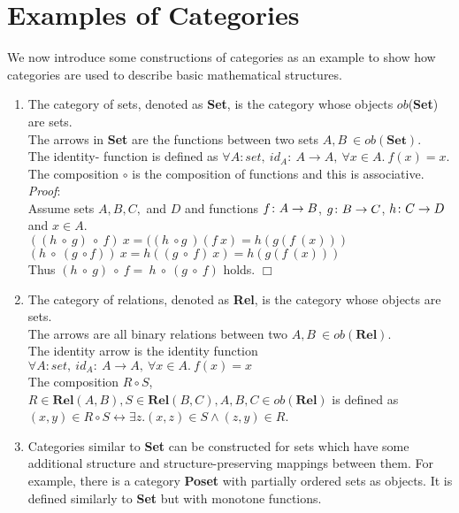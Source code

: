 \section {Examples of Categories}
We now introduce some constructions of categories as an example to show
how categories are used to describe basic mathematical structures.
\begin {enumerate}
 \item The category of sets, denoted as \textbf{Set}, is the category whose objects $ob$(\textbf{Set}) are sets.
   \\ The arrows in \textbf{Set} are the functions between two sets $A,B\ \in ob(\textbf{Set}).$
   \\ The identity- function is defined as $\forall A: set, \ id_A:\ A \to A,\ \forall x \in A. \ f (x) = x$.
   \\ The composition $\circ$ is the composition of functions and this is associative. \\\textit{Proof}:
   \\ Assume sets $A, B, C,$ and $D$ and functions $f \from A \to B$, $g \from B \to C$, $h \from C \to D$ and $x \in A$.
   \\ $((h\ \circ \ g)\ \circ\ f)\ x = ((h \ \circ g \ )(f \ x) =h(g(f\  (x))) $
   \\ $(h\ \circ \ (g \ \circ f))\ x = h ((g\ \circ \ f) \ x) = h(g(f \ (x)))$
   \\ Thus $(h\ \circ \ g)\ \circ \ f = \ h \ \circ \ (g \ \circ \ f)$ holds. $\Box$

 \item The category of relations, denoted as \textbf{Rel}, is the category whose objects are sets.
   \\The arrows are all binary relations between two $A,B \ \in ob(\textbf{Rel}).$
   \\The identity arrow  is the identity function $\forall A: set, \ id_A:\ A \to A,\ \forall x \in A. \ f (x) = x$
   \\ The composition $R \circ S$, $R  \in \textbf{Rel}(A,B), S \in \textbf{Rel}(B,C), A,B,C \in ob(\textbf{Rel})$ is defined as $ (x,y) \in  R \circ S \leftrightarrow \exists  z.(x,z) \in S \land (z,y) \in R$.
   
  \item Categories similar to \textbf{Set} can be constructed for sets which have some additional structure and structure-preserving mappings between them. For example, there is a category \textbf{Poset} with partially ordered sets as objects. It is defined similarly to \textbf{Set} but with monotone functions. 
  

\end{enumerate}

